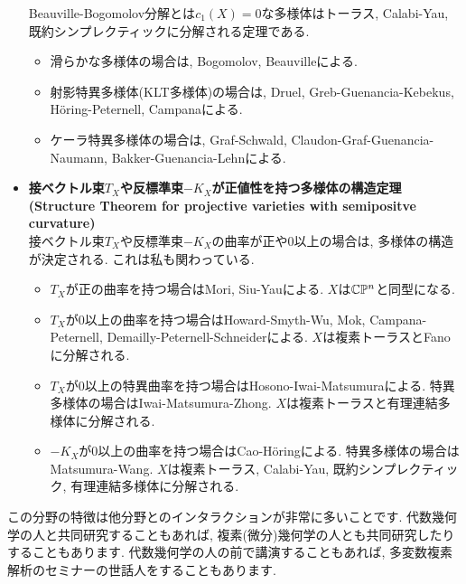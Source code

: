 \begin{itemize}[left=0pt]
 Beauville-Bogomolov分解とは$c_1(X)=0$な多様体はトーラス, Calabi-Yau, 既約シンプレクティックに分解される定理である. 
\begin{itemize}
  \setlength{\parskip}{0cm} %
  \setlength{\itemsep}{0cm} %
\item 滑らかな多様体の場合は, Bogomolov, Beauvilleによる. 
\item 射影特異多様体(KLT多様体)の場合は, Druel, Greb-Guenancia-Kebekus, H\"oring-Peternell, Campanaによる. 
\item ケーラ特異多様体の場合は, Graf-Schwald, Claudon-Graf-Guenancia-Naumann, Bakker-Guenancia-Lehnによる. 
\end{itemize}
\item \textbf{接ベクトル束$T_X$や反標準束$-K_X$が正値性を持つ多様体の構造定理 \\ (Structure Theorem for  projective varieties with semipositve curvature)} \\
接ベクトル束$T_X$や反標準束$-K_X$の曲率が正や0以上の場合は, 多様体の構造が決定される. これは私も関わっている. 
\begin{itemize}
  \setlength{\parskip}{0cm} %
  \setlength{\itemsep}{0cm} %
\item $T_X$が正の曲率を持つ場合はMori, Siu-Yauによる. $X$は$ \mathbb{C} \mathbb{P}^n$と同型になる.   
\item $T_X$が0以上の曲率を持つ場合はHoward-Smyth-Wu, Mok, Campana-Peternell, Demailly-Peternell-Schneiderによる. $X$は複素トーラスとFanoに分解される.  
\item $T_X$が0以上の特異曲率を持つ場合はHosono-Iwai-Matsumuraによる. 特異多様体の場合はIwai-Matsumura-Zhong. $X$は複素トーラスと有理連結多様体に分解される.  
\item $-K_X$が0以上の曲率を持つ場合はCao-H\"oringによる. 特異多様体の場合はMatsumura-Wang.  $X$は複素トーラス, Calabi-Yau, 既約シンプレクティック, 有理連結多様体に分解される.  
\end{itemize}
\end{itemize}

この分野の特徴は他分野とのインタラクションが非常に多いことです. 代数幾何学の人と共同研究することもあれば, 複素(微分)幾何学の人とも共同研究したりすることもあります. 代数幾何学の人の前で講演することもあれば, 多変数複素解析のセミナーの世話人をすることもあります.

